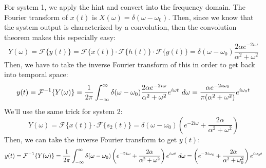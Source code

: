\documentclass[10pt]{article}
\begin{document}
\begin{enumerate}[label=\alph*)]
			\begin{solution}
				For system 1, we apply the hint and convert into the frequency domain. The Fourier transform 
				of \( x(t) \) is \( X(\omega) = \delta(\omega - \omega_0) \). Then, since we know that the 
				system output is characterized by a convolution, then the convolution theorem makes this especially 
				easy: 
				\[
				Y(\omega) =\mathcal F \{y(t)\}  = \mathcal F \{x(t)\} \cdot \mathcal F \{h(t)\} \cdot \mathcal F \{g(t)\} 
				= \delta(\omega - \omega_0)  \frac{2\alpha e^{-2 i \omega}}{\alpha^2 + \omega^2}
				\] 
				Then, we have to take the inverse Fourier transform of this in order to get back into 
				temporal space:
				\[
				y(t) = \mathcal F^{-1} \{Y(\omega)\}  = \frac{1}{2\pi}\int_{-\infty}^{\infty} 
				\delta(\omega - \omega_0) \frac{2\alpha e^{-2 i \omega}}{\alpha^2 + \omega^2} e^{i \omega t}\ d
				\omega = \frac{\alpha e^{-2 i \omega_0}}{\pi(\alpha^2 + \omega^2)} e^{ i \omega_0 t}
				\] 
				We'll use the same trick for system 2: 
				\[
				Y(\omega) = \mathcal F \{x(t)\}  \cdot \mathcal F \{s_2(t)\} = \delta(\omega - \omega_0) 
				\left( e^{-2 i \omega} + \frac{2\alpha}{\alpha^2 + \omega^2} \right) 
				\] 
				Then, we can take the inverse Fourier transform to get \( y(t) \):
				\[
				y(t) = \mathcal F^{-1} \{Y(\omega)\} = \frac{1}{2\pi}\int_{-\infty}^{\infty} 
				\delta(\omega - \omega_0)\left( e^{-2 i \omega} + \frac{2\alpha}{\alpha^2 + \omega^2} \right) 
				e^{i \omega t}\ d \omega = \left( e^{-2 i \omega_0} + \frac{2\alpha}{\alpha^2 + \omega_0^2} \right) 
				e^{i \omega_0t}
				\] 

			\end{solution}
	\end{enumerate}
\end{document}
